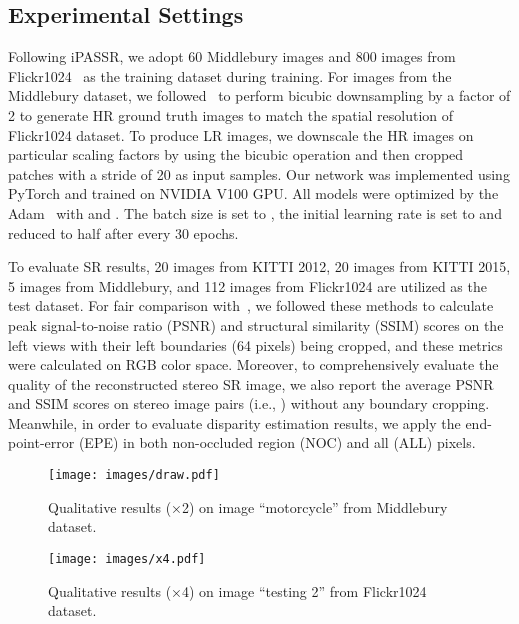 \documentclass[sigconf]{acmart}
\begin{document}
\subsection{Experimental Settings}
Following iPASSR\cite{Wang2020SymmetricPA}, we adopt 60 Middlebury images and 800 images from Flickr1024~\cite{Wang2019Flickr1024AL} as the training dataset during training. For images from the Middlebury dataset, we followed~\cite{Jeon2018EnhancingTS,Wang2019LearningPA,Wang2020ParallaxAF,Ying2020ASA, Wang2020SymmetricPA} to perform bicubic downsampling by a factor of 2 to generate HR ground truth images to match the spatial resolution of Flickr1024 dataset. To produce LR images, we downscale the HR images on particular scaling factors by using the bicubic operation and then cropped  patches with a stride of 20 as input samples. Our network was implemented using PyTorch and trained on NVIDIA V100 GPU. All models were optimized by the Adam~\cite{Kingma2015AdamAM} with  and . The batch size is set to , the initial learning rate is set to  and reduced to half after every 30 epochs. 

To evaluate SR results, 20 images from KITTI 2012\cite{Geiger2012AreWR}, 20 images from KITTI 2015\cite{Menze2015ObjectSF}, 5 images from Middlebury, and 112 images from Flickr1024 are utilized as the test dataset. For fair comparison with~\cite{Jeon2018EnhancingTS,Wang2019LearningPA,Ying2020ASA}, we followed these methods to calculate peak signal-to-noise ratio (PSNR) and structural similarity (SSIM) scores on the left views with their left boundaries (64 pixels) being cropped, and these metrics were calculated on RGB color space. Moreover, to comprehensively evaluate the quality of the reconstructed stereo SR image, we also report the average PSNR and SSIM scores on stereo image pairs (i.e., ) without any boundary cropping. Meanwhile, in order to evaluate disparity estimation results, we apply the end-point-error (EPE) in both non-occluded region (NOC) and all (ALL) pixels.

\begin{figure*}[t]
  \centering
  \texttt{[image: images/draw.pdf]}
  \vspace{-10px}
  \caption{Qualitative results (×2) on image “motorcycle” from Middlebury dataset.}
  \label{fig-4}
  \vspace{-12pt}
\end{figure*}

\begin{figure*}[t]
  \centering
  \texttt{[image: images/x4.pdf]}
  \vspace{-10px}
  \caption{Qualitative results (×4) on image “testing 2” from Flickr1024 dataset.}
  \label{fig-5}
  \vspace{-8pt}
\end{figure*}
\end{document}
